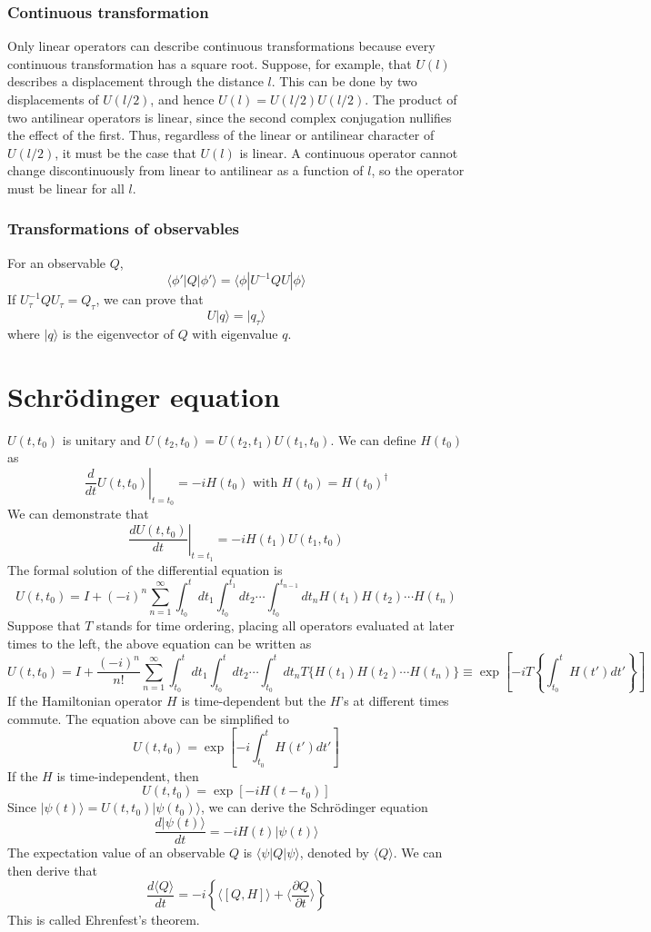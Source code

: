 \subsubsection{Continuous transformation} 
Only linear operators can describe continuous transformations because every continuous transformation has a square root. Suppose, for example, that $U(l)$ describes a displacement through the distance $l$. This can be done by two displacements of $U(l/2)$, and hence $U(l) = U(l/2) U(l/2)$. The product of two antilinear operators is linear, since the second complex conjugation nullifies the effect of the first. Thus, regardless of the linear or antilinear character of $U(l/2)$, it must be the case that $U(l)$ is linear. A continuous operator cannot change discontinuously from linear to antilinear as a function of $l$, so the operator must be linear for all $l$.

\subsubsection{Transformations of observables}
\noindent
For an observable $Q$, 
\[\langle \phi' | Q | \phi' \rangle = \langle \phi | U^{-1}QU | \phi \rangle \]
If $U_{\tau}^{-1}QU_{\tau} = Q_{\tau}$, we can prove that
\[U|q\rangle = | q_{\tau}\rangle\]
where $|q\rangle$ is the eigenvector of $Q$ with eigenvalue $q$.


\section{Schr\"{o}dinger equation}
\noindent
$U(t,t_0)$ is unitary and $U(t_2,t_0) = U(t_2,t_1)U(t_1,t_0)$. We can define $H(t_0)$ as
\[\left. \frac{d}{dt}U(t,t_0)\right|_{t=t_0} = -iH(t_0) \mbox{ with } H(t_0) = H(t_0)^{\dagger}\]
We can demonstrate that
\[\left. \frac{dU(t,t_0)}{dt}\right|_{t=t_1} = -iH(t_1)U(t_1,t_0) \]
The formal solution of the differential equation is
\[U(t,t_0) = I + (-i)^n \sum_{n=1}^{\infty} \int_{t_0}^{t}dt_1 \int_{t_0}^{t_1}dt_2 \cdots \int_{t_0}^{t_{n-1}} dt_n H(t_1)H(t_2)\cdots H(t_n)\]
Suppose that $T$ stands for time ordering, placing all operators evaluated at later times to the left, the above equation can be written as
\[U(t,t_0) = I + \frac{(-i)^n}{n!} \sum_{n=1}^{\infty} \int_{t_0}^{t}dt_1 \int_{t_0}^{t}dt_2 \cdots \int_{t_0}^{t} dt_n T\{H(t_1)H(t_2)\cdots H(t_n)\} \equiv \exp \left[ -i T\left\{ \int_{t_0}^{t} H(t')dt'\right\} \right] \]
If the Hamiltonian operator $H$ is time-dependent but the $H$'s at different times commute. The equation above can be simplified to
\[U(t,t_0) = \exp \left[ -i \int_{t_0}^{t} H(t')dt' \right] \]
If the $H$ is time-independent, then
\[U(t,t_0) = \exp \left[ -i H(t-t_0) \right] \]
Since $|\psi(t)\rangle = U(t,t_0) |\psi(t_0)\rangle$, we can derive the Schr\"{o}dinger equation
\[\frac{d |\psi(t)\rangle}{dt} = -iH(t) |\psi(t)\rangle\]
The expectation value of an observable $Q$ is $\langle \psi | Q | \psi \rangle$, denoted by $\langle Q \rangle$. We can then derive that
\[\frac{d\langle Q \rangle}{dt} = -i \left\{ \langle [Q,H] \rangle + \langle \frac{\partial Q}{\partial t} \rangle \right\}\]
This is called Ehrenfest's theorem. 

